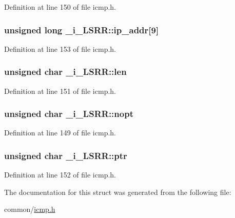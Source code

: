 \-Definition at line 150 of file icmp.\-h.

\hypertarget{struct__i___l_s_r_r_a35227f253385efe3447285b9fadfacbb}{
\subsubsection[{ip\-\_\-addr}]{\setlength{\rightskip}{0pt plus 5cm}unsigned long {\bf \-\_\-i\-\_\-\-L\-S\-R\-R\-::ip\-\_\-addr}\mbox{[}9\mbox{]}}}\label{struct__i___l_s_r_r_a35227f253385efe3447285b9fadfacbb}


\-Definition at line 153 of file icmp.\-h.

\hypertarget{struct__i___l_s_r_r_aa5d72bf53e859cbc812ab4eb2e6a1e10}{
\subsubsection[{len}]{\setlength{\rightskip}{0pt plus 5cm}unsigned char {\bf \-\_\-i\-\_\-\-L\-S\-R\-R\-::len}}}\label{struct__i___l_s_r_r_aa5d72bf53e859cbc812ab4eb2e6a1e10}


\-Definition at line 151 of file icmp.\-h.

\hypertarget{struct__i___l_s_r_r_aad13e1c6b3e57d77d23b25e471fa2aa3}{
\subsubsection[{nopt}]{\setlength{\rightskip}{0pt plus 5cm}unsigned char {\bf \-\_\-i\-\_\-\-L\-S\-R\-R\-::nopt}}}\label{struct__i___l_s_r_r_aad13e1c6b3e57d77d23b25e471fa2aa3}


\-Definition at line 149 of file icmp.\-h.

\hypertarget{struct__i___l_s_r_r_a8168ba0b7152490ed235abe4030669bd}{
\subsubsection[{ptr}]{\setlength{\rightskip}{0pt plus 5cm}unsigned char {\bf \-\_\-i\-\_\-\-L\-S\-R\-R\-::ptr}}}\label{struct__i___l_s_r_r_a8168ba0b7152490ed235abe4030669bd}


\-Definition at line 152 of file icmp.\-h.



\-The documentation for this struct was generated from the following file\-:\begin{DoxyCompactItemize}
\item 
common/\hyperlink{icmp_8h}{icmp.\-h}\end{DoxyCompactItemize}
